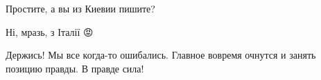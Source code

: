 \begin{itemize}
\begin{itemize}
 
Простите, а вы из Киевии пишите?

 
Ні, мразь, з Італії
😡
\end{itemize}

 
Держись! Мы все когда-то ошибались. Главное вовремя очнутся и занять позицию правды. В правде сила!

\end{itemize}

